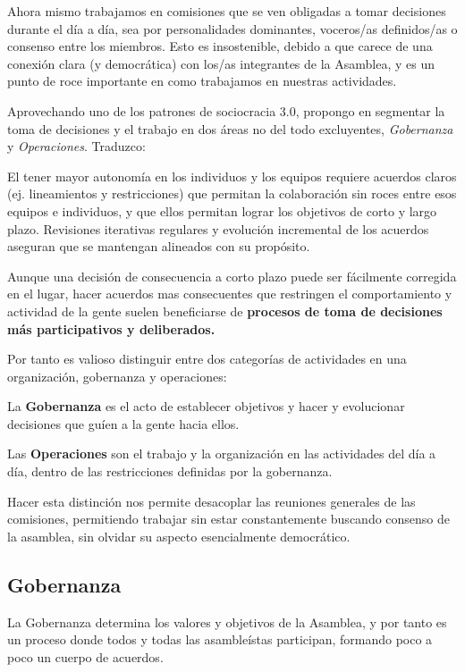 \documentclass[justified]{tufte-handout} %
\begin{document}
Ahora mismo trabajamos en comisiones que se ven obligadas a tomar decisiones durante el día a día, sea por personalidades dominantes, voceros/as definidos/as o consenso entre los miembros. Esto es insostenible, debido a que carece de una conexión clara (y democrática) con los/as integrantes de la Asamblea, y es un punto de roce importante en como trabajamos en nuestras actividades.

Aprovechando uno de los patrones de sociocracia 3.0, propongo en segmentar la toma de decisiones y el trabajo en dos áreas no del todo excluyentes, \textit{Gobernanza} y \textit{Operaciones}. Traduzco\cite{gobernanzayoperaciones}:

\begin{displayquote}
	El tener mayor autonomía en los individuos y los equipos requiere acuerdos claros (ej. lineamientos y restricciones) que permitan la colaboración sin roces entre esos equipos e individuos, y que ellos permitan lograr los objetivos de corto y largo plazo. Revisiones iterativas regulares y evolución incremental de los acuerdos aseguran que se mantengan alineados con su propósito.

	Aunque una decisión de consecuencia a corto plazo puede ser fácilmente corregida en el lugar, hacer acuerdos mas consecuentes que restringen el comportamiento  y actividad de la gente suelen beneficiarse de \textbf{procesos de toma de decisiones más participativos y deliberados.}

	Por tanto es valioso distinguir entre dos categorías de actividades en una organización, gobernanza y operaciones:

	La \textbf{Gobernanza} es el acto de establecer objetivos y hacer y evolucionar decisiones que guíen a la gente hacia ellos.

	Las \textbf{Operaciones} son el trabajo y la organización en las actividades del día a día, dentro de las restricciones definidas por la gobernanza.
\end{displayquote}

Hacer esta distinción nos permite desacoplar las reuniones generales de las comisiones, permitiendo trabajar sin estar constantemente buscando consenso de la asamblea, sin olvidar su aspecto esencialmente democrático.

\subsection{Gobernanza}
La Gobernanza determina los valores y objetivos de la Asamblea, y por tanto es un proceso donde todos y todas las asambleístas participan, formando poco a poco un cuerpo de acuerdos.
\end{document}
